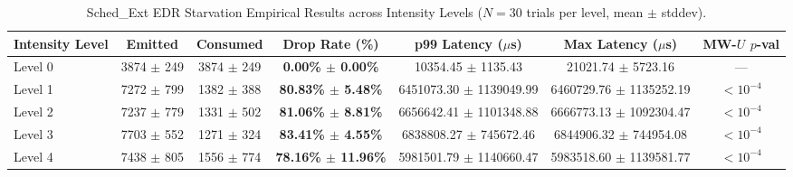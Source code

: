 \begin{table}[t]
\centering
\small
\caption{Sched\_Ext EDR Starvation Empirical Results across Intensity Levels ($N=30$ trials per level, mean $\pm$ stddev).}
\label{tab:edr_starvation_results}
\begin{tabular}{lcccccc}
\toprule
\textbf{Intensity Level} & \textbf{Emitted} & \textbf{Consumed} & \textbf{Drop Rate (\%)} & \textbf{p99 Latency ($\mu$s)} & \textbf{Max Latency ($\mu$s)} & \textbf{MW-$U$ $p$-val} \\
\midrule
Level 0 & 3874 $\pm$ 249 & 3874 $\pm$ 249 & \textbf{0.00\% $\pm$ 0.00\%} & 10354.45 $\pm$ 1135.43 & 21021.74 $\pm$ 5723.16 & --- \\
Level 1 & 7272 $\pm$ 799 & 1382 $\pm$ 388 & \textbf{80.83\% $\pm$ 5.48\%} & 6451073.30 $\pm$ 1139049.99 & 6460729.76 $\pm$ 1135252.19 & $< 10^{-4}$ \\
Level 2 & 7237 $\pm$ 779 & 1331 $\pm$ 502 & \textbf{81.06\% $\pm$ 8.81\%} & 6656642.41 $\pm$ 1101348.88 & 6666773.13 $\pm$ 1092304.47 & $< 10^{-4}$ \\
Level 3 & 7703 $\pm$ 552 & 1271 $\pm$ 324 & \textbf{83.41\% $\pm$ 4.55\%} & 6838808.27 $\pm$ 745672.46 & 6844906.32 $\pm$ 744954.08 & $< 10^{-4}$ \\
Level 4 & 7438 $\pm$ 805 & 1556 $\pm$ 774 & \textbf{78.16\% $\pm$ 11.96\%} & 5981501.79 $\pm$ 1140660.47 & 5983518.60 $\pm$ 1139581.77 & $< 10^{-4}$ \\
\bottomrule
\end{tabular}
\end{table}
